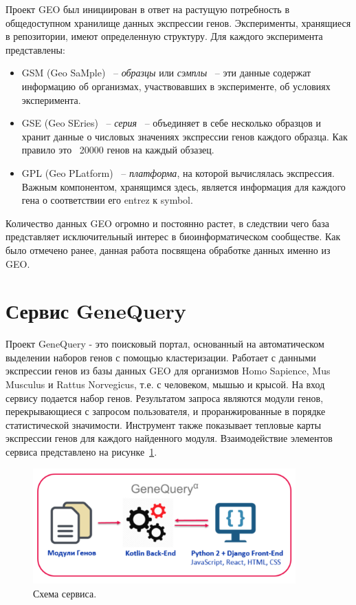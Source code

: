 \documentclass[times,specification,annotation]{itmo-student-thesis}
\begin{document}
Проект GEO был инициирован в ответ на растущую потребность в общедоступном хранилище данных экспрессии генов.\cite{GEO} Эксперименты, хранящиеся в репозитории, имеют определенную структуру. Для каждого эксперимента представлены: 
\begin{itemize}
    \item GSM (Geo SaMple) ~-- \textit{образцы} или \textit{сэмплы} ~-- эти данные содержат информацию об организмах, участвовавших в эксперименте, об условиях эксперимента.
    \item GSE (Geo SEries) ~-- \textit{серия} ~-- объединяет в себе несколько образцов и хранит данные о числовых значениях экспрессии генов каждого образца. Как правило это ~20000 генов на каждый обзазец.
    \item GPL (Geo PLatform) ~-- \textit{платформа}, на которой вычислялась экспрессия. Важным компонентом, хранящимся здесь, является информация для каждого гена о соответствии его entrez к symbol.     
\end{itemize}

Количество данных GEO огромно и постоянно растет, в следствии чего база представляет исключительный интерес в биоинформатическом сообществе. Как было отмечено ранее, данная работа посвящена обработке данных именно из GEO.   

\section{Сервис GeneQuery}

Проект GeneQuery\cite{GeneQuery} - это поисковый портал, основанный на автоматическом выделении наборов генов с помощью кластеризации. Работает с данными экспрессии генов из базы данных GEO для организмов Homo Sapience, Mus Musculus и Rattus Norvegicus, т.е. с человеком, мышью и крысой. На вход сервису подается набор генов. Результатом запроса являются модули генов, перекрывающиеся с запросом пользователя, и проранжированные в порядке статистической значимости. Инструмент также показывает тепловые карты экспрессии генов для каждого найденного модуля. 
Взаимодействие элементов сервиса представлено на рисунке~\ref{GeneQuery_service}. 

\begin{figure}[!h]
    \caption{Схема сервиса.}\label{GeneQuery_service}
    \centering
    \includegraphics[width=0.9\textwidth]{GeneQuery_scheme}
\end{figure} 
\end{document}
